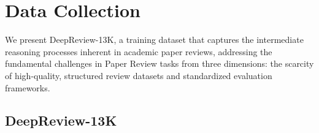 \documentclass{article}
\begin{document}
\section{Data Collection}




We present DeepReview-13K, a training dataset that captures the intermediate reasoning processes inherent in academic paper reviews, addressing the fundamental challenges in Paper Review tasks from three dimensions: the scarcity of high-quality, structured review datasets and standardized evaluation frameworks. 

\subsection{DeepReview-13K}
\end{document}
